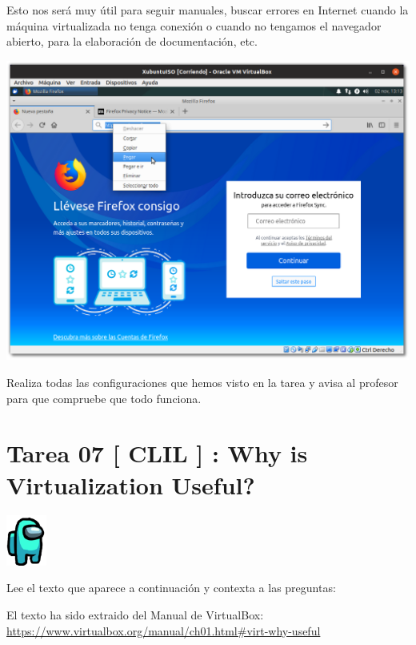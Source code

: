 \documentclass[11pt]{article}
\begin{document}
Esto nos será muy útil para seguir manuales, buscar errores en Internet
cuando la máquina virtualizada no tenga conexión o cuando no tengamos el
navegador abierto, para la elaboración de documentación, etc.

\begin{center}
\includegraphics[width=.9\linewidth]{imgs/VBox_GuestAdd_LinuX_027.png}
\end{center}

Realiza todas las configuraciones que hemos visto en la tarea y avisa al
profesor para que compruebe que todo funciona.

\newpag

\newpage

\newpage
\section{Tarea 07 [ CLIL ] : Why is Virtualization Useful?}
\label{sec:org1be2a03}

\begin{center}
\includegraphics[width=50px]{imgs/amongus.png}
\end{center}


Lee el texto que aparece a continuación y contexta a las preguntas:

El texto ha sido extraido del Manual de VirtualBox:
\url{https://www.virtualbox.org/manual/ch01.html\#virt-why-useful}



\newpage 
\end{document}
